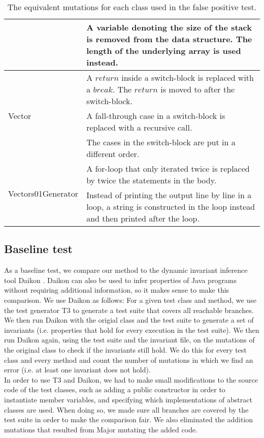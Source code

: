 \documentclass[a4paper, fleqn]{article}
\begin{document}
\begin{table}
\begin{tabular}{ | p{2.7cm} | p{8.64cm} |}
 & A variable denoting the size of the stack is removed from the data structure. The length of the underlying array is used instead. \\ \hline
    \multirow{3}{*}{Vector} & A $return$ inside a switch-block is replaced with a $break$. The $return$ is moved to after the switch-block. \\ \cline{2-2}
 & A fall-through case in a switch-block is replaced with a recursive call. \\ \cline{2-2}
 & The cases in the switch-block are put in a different order. \\ \hline
    \multirow{2}{*}{Vectors01Generator} & A for-loop that only iterated twice is replaced by twice the statements in the body. \\ \cline{2-2}
 & Instead of printing the output line by line in a loop, a string is constructed in the loop instead and then printed after the loop. \\ \hline
    \end{tabular}
\caption{The equivalent mutations for each class used in the false positive test.}
\label{kind of mutations}
\end{table}

\subsection{Baseline test}
As a baseline test, we compare our method to the dynamic invariant inference tool Daikon \cite{daikon}. Daikon can also be used to infer properties of Java programs without requiring additional information, so it makes sense to make this comparison. We use Daikon as follows: For a given test class and method, we use the test generator T3 \cite{t3} to generate a test suite that covers all reachable branches. We then run Daikon with the origial class and the test suite to generate a set of invariants (i.e. properties that hold for every execution in the test suite). We then run Daikon again, using the test suite and the invariant file, on the mutations of the original class to check if the invariants still hold. We do this for every test class and every method and count the number of mutations in which we find an error (i.e. at least one invariant does not hold).
\\
In order to use T3 and Daikon, we had to make small modifications to the source code of the test classes, such as adding a public constructor in order to instantiate member variables, and specifying which implementations of abstract classes are used. When doing so, we made sure all branches are covered by the test suite in order to make the comparison fair. We also eliminated the addition mutations that resulted from Major mutating the added code.
\end{document}
